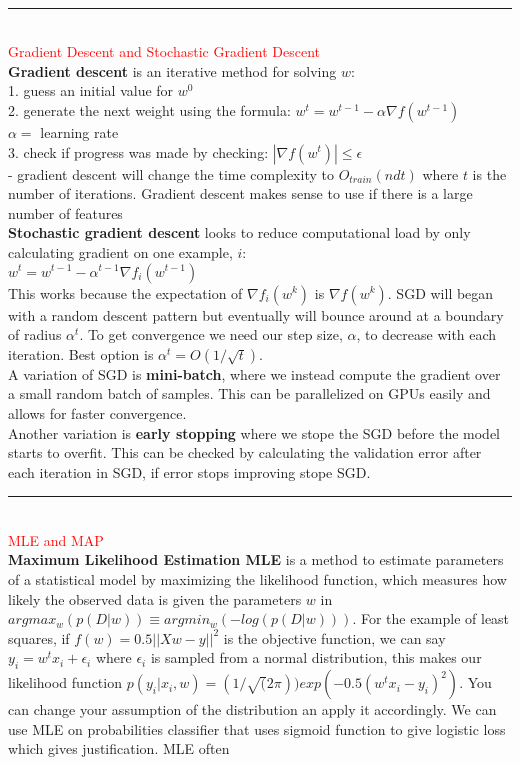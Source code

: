 \documentclass[8pt]{extarticle}
\begin{document}
\begin{multicols*}{2}
\\
\rule{\linewidth}{0.5mm} 
\\
\textcolor{red}{Gradient Descent and Stochastic Gradient Descent}
\\
\textbf{Gradient descent} is an iterative method for solving $w$:
\\
1. guess an initial value for $w^0$
\\
2. generate the next weight using the formula:
$w^t = w^{t-1} - \alpha \nabla f(w^{t-1})$ 
\\
$\alpha =$ learning rate
\\
3. check if progress was made by checking: $|\nabla f(w^t)| \leq \epsilon$
\\
- gradient descent will change the time complexity to $O_{train}(ndt)$ where $t$ is the number of iterations. Gradient descent makes sense to use if there is a large number of features
\\
\textbf{Stochastic gradient descent} looks to reduce computational load by only calculating gradient on one example, $i$:
\\
$w^t = w^{t-1} - \alpha^{t-1} \nabla f_i(w^{t-1})$ 
\\
This works because the expectation of $\nabla f_i(w^{k})$ is $\nabla f(w^{k})$. SGD will began with a random descent pattern but eventually will bounce around at a boundary of radius $\alpha^t$. To get convergence we need our step size, $\alpha$, to decrease with each iteration. Best option is $\alpha^t = O(1/\sqrt{t})$.
\\
A variation of SGD is \textbf{mini-batch}, where we instead compute the gradient over a small random batch of samples. This can be parallelized on GPUs easily and allows for faster convergence.
\\
Another variation is \textbf{early stopping} where we stope the SGD before the model starts to overfit. This can be checked by calculating the validation error after each iteration in SGD, if error stops improving stope SGD.
\\
\rule{\linewidth}{0.5mm} 
\\
\textcolor{red}{MLE and MAP}
\\
\textbf{Maximum Likelihood Estimation MLE} is a method to estimate parameters of a statistical model by maximizing the likelihood function, which measures how likely the observed data is given the parameters $w$ in  $argmax_w(p(D|w)) \equiv argmin_w(-log(p(D|w)))$. For the example of least squares, if $f(w) = 0.5||Xw-y||^2$ is the objective function, we can say $y_i = w^tx_i + \epsilon_i$ where $\epsilon_i$ is sampled from a normal distribution, this makes our likelihood function $p(y_i|x_i,w) = (1/\sqrt(2\pi))exp(-0.5(w^tx_i-y_i)^2)$. You can change your assumption of the distribution an apply it accordingly. We can use MLE on probabilities classifier that uses sigmoid function to give logistic loss which gives justification. MLE often

\end{multicols*}
\end{document}
